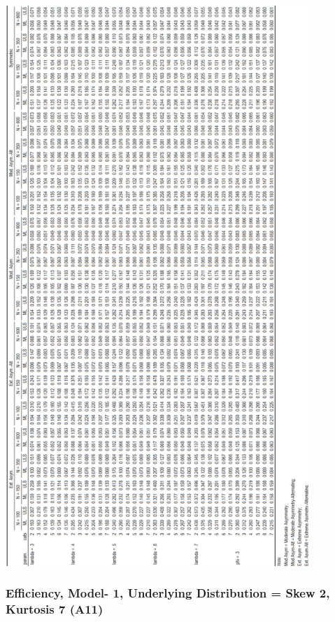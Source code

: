 \documentclass[10,a4paperpaper,]{article}
\begin{document}
\includegraphics[width=325pt]{./figures/tabA10}

\subsubsection{Efficiency, Model- 1, Underlying Distribution = Skew 2, Kurtosis 7 (A11)}
\end{document}
